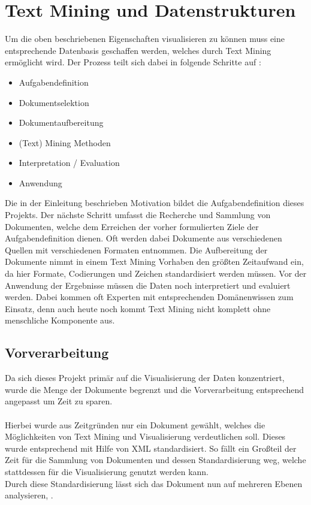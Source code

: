 \newpage
\section{Text Mining und Datenstrukturen}
Um die oben beschriebenen Eigenschaften visualisieren zu k\"onnen muss eine entsprechende Datenbasis geschaffen werden, welches durch Text Mining erm\"oglicht wird. Der Prozess teilt sich dabei in folgende Schritte auf \cite{Hippner}:
\begin{itemize}
\item Aufgabendefinition
\item Dokumentselektion
\item Dokumentaufbereitung
\item (Text) Mining Methoden
\item Interpretation / Evaluation
\item Anwendung
\end{itemize}
Die in der Einleitung beschrieben Motivation bildet die Aufgabendefinition dieses Projekts. Der n\"achste Schritt umfasst die Recherche und Sammlung von Dokumenten, welche dem Erreichen der vorher formulierten Ziele der Aufgabendefinition dienen. Oft werden dabei Dokumente aus verschiedenen Quellen mit verschiedenen Formaten entnommen. Die Aufbereitung der Dokumente nimmt in einem Text Mining Vorhaben den gr\"oßten Zeitaufwand ein, da hier Formate, Codierungen und Zeichen standardisiert werden m\"ussen. Vor der Anwendung der Ergebnisse m\"ussen die Daten noch interpretiert und evaluiert werden. Dabei kommen oft Experten mit entsprechenden Dom\"anenwissen zum Einsatz, denn auch heute noch kommt Text Mining nicht komplett ohne menschliche Komponente aus.

\subsection{Vorverarbeitung}
Da sich dieses Projekt prim\"ar auf die Visualisierung der Daten konzentriert, wurde die Menge der Dokumente begrenzt und die Vorverarbeitung entsprechend angepasst um Zeit zu sparen. \\
\\
Hierbei wurde aus Zeitgr\"unden nur ein Dokument gew\"ahlt, welches die M\"oglichkeiten von Text Mining und Visualisierung verdeutlichen soll. Dieses wurde entsprechend mit Hilfe von XML standardisiert. So f\"allt ein Großteil der Zeit f\"ur die Sammlung von Dokumenten und dessen Standardisierung weg, welche stattdessen f\"ur die Visualisierung genutzt werden kann. \\
Durch diese Standardisierung l\"asst sich das Dokument nun auf mehreren Ebenen analysieren\cite{Weiss}, \cite{Hippner}.

